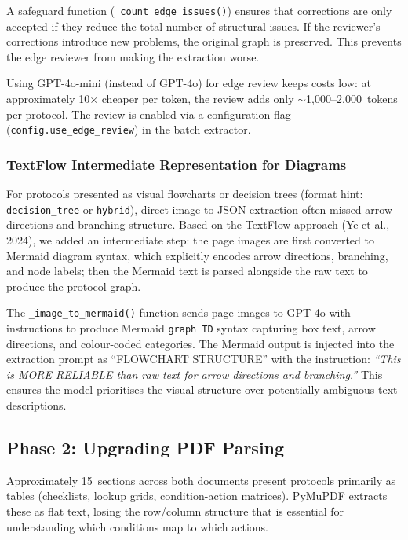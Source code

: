 \documentclass[12pt,a4paper]{article}
\begin{document}
A safeguard function (\texttt{\_count\_edge\_issues()}) ensures that corrections are only accepted if they reduce the total number of structural issues. If the reviewer's corrections introduce new problems, the original graph is preserved. This prevents the edge reviewer from making the extraction worse.

Using GPT-4o-mini (instead of GPT-4o) for edge review keeps costs low: at approximately 10$\times$ cheaper per token, the review adds only $\sim$1,000--2,000~tokens per protocol. The review is enabled via a configuration flag (\texttt{config.use\_edge\_review}) in the batch extractor.

\subsubsection{TextFlow Intermediate Representation for Diagrams}

For protocols presented as visual flowcharts or decision trees (format hint: \texttt{decision\_tree} or \texttt{hybrid}), direct image-to-JSON extraction often missed arrow directions and branching structure. Based on the TextFlow approach (Ye et al., 2024), we added an intermediate step: the page images are first converted to Mermaid diagram syntax, which explicitly encodes arrow directions, branching, and node labels; then the Mermaid text is parsed alongside the raw text to produce the protocol graph.

The \texttt{\_image\_to\_mermaid()} function sends page images to GPT-4o with instructions to produce Mermaid \texttt{graph TD} syntax capturing box text, arrow directions, and colour-coded categories. The Mermaid output is injected into the extraction prompt as ``FLOWCHART STRUCTURE'' with the instruction: \emph{``This is MORE RELIABLE than raw text for arrow directions and branching.''} This ensures the model prioritises the visual structure over potentially ambiguous text descriptions.

\subsection{Phase 2: Upgrading PDF Parsing}
\label{sec:phase2}

Approximately 15~sections across both documents present protocols primarily as tables (checklists, lookup grids, condition-action matrices). PyMuPDF extracts these as flat text, losing the row/column structure that is essential for understanding which conditions map to which actions.
\end{document}
